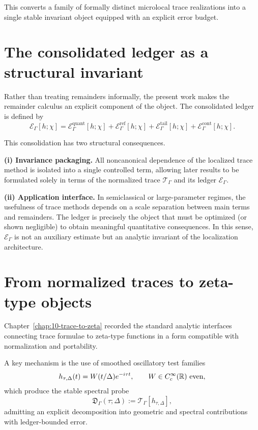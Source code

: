 This converts a family of formally distinct microlocal trace realizations into a single stable invariant object equipped with an
explicit error budget.

\section{The consolidated ledger as a structural invariant}
\label{sec:11.ledger}

Rather than treating remainders informally, the present work makes the remainder calculus an explicit component of the object.
The consolidated ledger is defined by
\[
\mathcal E_\Gamma[h;\chi]
=
\mathcal E^{\mathrm{quant}}_\Gamma[h;\chi]
+
\mathcal E^{\mathrm{ref}}_\Gamma[h;\chi]
+
\mathcal E^{\mathrm{tail}}_\Gamma[h;\chi]
+
\mathcal E^{\mathrm{cont}}_\Gamma[h;\chi].
\]

This consolidation has two structural consequences.

\medskip
\noindent\textbf{(i) Invariance packaging.}
All noncanonical dependence of the localized trace method is isolated into a single controlled term, allowing later results to be
formulated solely in terms of the normalized trace $\mathcal T_\Gamma$ and its ledger $\mathcal E_\Gamma$.

\medskip
\noindent\textbf{(ii) Application interface.}
In semiclassical or large-parameter regimes, the usefulness of trace methods depends on a scale separation between main terms and
remainders.  The ledger is precisely the object that must be optimized (or shown negligible) to obtain meaningful quantitative
consequences.  In this sense, $\mathcal E_\Gamma$ is not an auxiliary estimate but an analytic invariant of the localization
architecture.

\section{From normalized traces to zeta-type objects}
\label{sec:11.zeta}

Chapter~\ref{chap:10-trace-to-zeta} recorded the standard analytic interfaces connecting trace formulae to zeta-type functions in a
form compatible with normalization and portability.

A key mechanism is the use of smoothed oscillatory test families
\[
h_{\tau,\Delta}(t)=W(t/\Delta)e^{-i\tau t},
\qquad W\in C_c^\infty(\mathbb{R})\ \text{even},
\]
which produce the stable spectral probe
\[
\mathfrak D_\Gamma(\tau;\Delta):=\mathcal T_\Gamma[h_{\tau,\Delta}],
\]
admitting an explicit decomposition into geometric and spectral contributions with ledger-bounded error.

